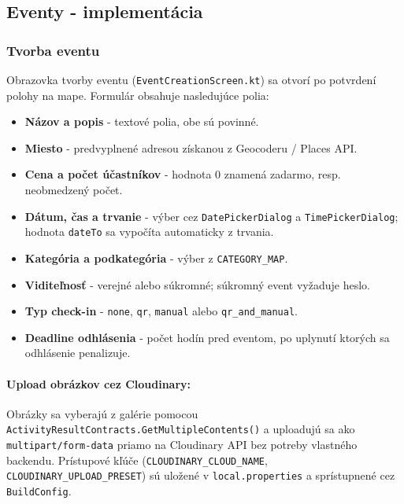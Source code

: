 \subsection{Eventy - implementácia}                                                                                                                                                                                                                                 
\subsubsection{Tvorba eventu}                                                                                                                                                                                                                                       
Obrazovka tvorby eventu (\texttt{EventCreationScreen.kt}) sa otvorí po potvrdení polohy na mape. Formulár obsahuje nasledujúce polia:

\begin{itemize}[noitemsep, nolistsep] %
    \item \textbf{Názov a popis} - textové polia, obe sú povinné.                                                                                                                                                                                        
    \item \textbf{Miesto} - predvyplnené adresou získanou z Geocoderu / Places API.
    \item \textbf{Cena a počet účastníkov} - hodnota 0 znamená zadarmo, resp. neobmedzený počet.
    \item \textbf{Dátum, čas a trvanie} - výber cez \texttt{DatePickerDialog} a \texttt{TimePickerDialog}; hodnota \texttt{dateTo} sa vypočíta automaticky z trvania.
    \item \textbf{Kategória a podkategória} - výber z \texttt{CATEGORY\_MAP}.
    \item \textbf{Viditeľnosť} - verejné alebo súkromné; súkromný event vyžaduje heslo.
    \item \textbf{Typ check-in} - \texttt{none}, \texttt{qr}, \texttt{manual} alebo \texttt{qr\_and\_manual}.
    \item \textbf{Deadline odhlásenia} - počet hodín pred eventom, po uplynutí ktorých sa odhlásenie penalizuje.
\end{itemize}

  \paragraph{Upload obrázkov cez Cloudinary:}
  Obrázky sa vyberajú z galérie pomocou
  \texttt{ActivityResultContracts.GetMultipleContents()} a uploadujú sa ako
  \texttt{multipart/form-data} priamo na Cloudinary API bez potreby vlastného
  backendu. Prístupové kľúče (\texttt{CLOUDINARY\_CLOUD\_NAME},
  \texttt{CLOUDINARY\_UPLOAD\_PRESET}) sú uložené v \texttt{local.properties}
  a sprístupnené cez \texttt{BuildConfig}.

